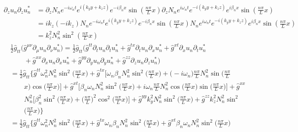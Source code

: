 \documentclass[english]{article}
\begin{document}
 {}
\begin{align*}
\partial_{z}u_{n}\partial_{z}u^{*}_{n} & =\partial_{z}N_{n}e^{-i\omega_{n}t}e^{i\left(k_{y}y+k_{z}z\right)}e^{-i\beta_{n}x}\sin\left(\frac{n\pi}{L}x\right)\partial_{z}N_{n}e^{i\omega_{n}t}e^{-i\left(k_{y}y+k_{z}z\right)}e^{i\beta_{n}x}\sin\left(\frac{n\pi}{L}x\right)\\
 & =ik_{z}\left(-ik_{z}\right)N_{n}e^{-i\omega_{n}t}e^{i\left(k_{y}y+k_{z}z\right)}e^{-i\beta_{n}x}\sin\left(\frac{n\pi}{L}x\right)N_{n}e^{i\omega_{n}t}e^{-i\left(k_{y}y+k_{z}z\right)}e^{i\beta_{n}x}\sin\left(\frac{n\pi}{L}x\right)\\
 & =k^{2}_{z}N^{2}_{n}\sin^{2}\left(\frac{n\pi}{L}x\right)
\end{align*}
 {}
\begin{align*}
 & \frac{1}{2}\hat{g}_{tt}\biggl(\hat{g}^{\mu\nu}\partial_{\mu}u_{n}\partial_{\nu}u^{*}_{n}\biggr)=\frac{1}{2}\hat{g}_{tt}\biggl(\hat{g}^{tt}\partial_{t}u_{n}\partial_{t}u^{*}_{n}+\hat{g}^{tx}\partial_{t}u_{n}\partial_{x}u^{*}_{n}+\hat{g}^{xt}\partial_{x}u_{n}\partial_{t}u^{*}_{n}\\
 & \qquad+\hat{g}^{xx}\partial_{x}u_{n}\partial_{x}u^{*}_{n}+\hat{g}^{yy}\partial_{y}u_{n}\partial_{y}u^{*}_{n}+\hat{g}^{zz}\partial_{z}u_{n}\partial_{z}u^{*}_{n}\biggr)\\
 & =\frac{1}{2}\hat{g}_{tt}\biggl\{\hat{g}^{tt}\omega^{2}_{n}N^{2}_{n}\sin^{2}\biggl(\frac{n\pi}{L}x\biggr)+\hat{g}^{tx}\biggl[\omega_{n}\beta_{n}N^{2}_{n}\sin^{2}\biggl(\frac{n\pi}{L}x\biggr)+\biggl(-i\omega_{n}\biggr)\frac{n\pi}{L}N^{2}_{n}\sin\biggl(\frac{n\pi}{L}\\
 & \qquad x\biggr)\cos\biggl(\frac{n\pi}{L}x\biggr)\biggr]+\hat{g}^{xt}\biggl[\beta_{n}\omega_{n}N^{2}_{n}\sin^{2}\biggl(\frac{n\pi}{L}x\biggr)+i\omega_{n}\frac{n\pi}{L}N^{2}_{n}\cos\biggl(\frac{n\pi}{L}x\biggr)\sin\biggl(\frac{n\pi}{L}x\biggr)\biggr]+\hat{g}^{xx}\\
 & \qquad N^{2}_{n}\biggl[\beta^{2}_{n}\sin^{2}\biggl(\frac{n\pi}{L}x\biggr)+\biggl(\frac{n\pi}{L}\biggr)^{2}\cos^{2}\biggl(\frac{n\pi}{L}x\biggr)\biggr]+\hat{g}^{yy}k^{2}_{y}N^{2}_{n}\sin^{2}\biggl(\frac{n\pi}{L}x\biggr)+\hat{g}^{zz}k^{2}_{z}N^{2}_{n}\sin^{2}\\
 & \qquad\biggl(\frac{n\pi}{L}x\biggr)\biggr\}\\
 & =\frac{1}{2}\hat{g}_{tt}\biggl\{\hat{g}^{tt}\omega^{2}_{n}N^{2}_{n}\sin^{2}\biggl(\frac{n\pi}{L}x\biggr)+\hat{g}^{tx}\omega_{n}\beta_{n}N^{2}_{n}\sin^{2}\biggl(\frac{n\pi}{L}x\biggr)+\hat{g}^{xt}\beta_{n}\omega_{n}N^{2}_{n}\sin^{2}\biggl(\frac{n\pi}{L}x\biggr)\\

\end{align*}
\end{document}
